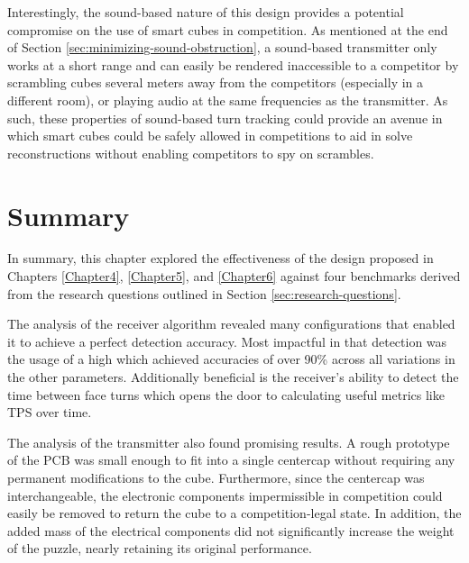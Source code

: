 Interestingly, the sound-based nature of this design provides a
potential compromise on the use of smart cubes in competition. As
mentioned at the end of Section \ref{sec:minimizing-sound-obstruction},
a sound-based transmitter only works at a short range and can easily be
rendered inaccessible to a competitor by scrambling cubes several
meters away from the competitors (especially in a different room), or
playing audio at the same frequencies as the transmitter. As such,
these properties of sound-based turn tracking could provide an avenue
in which smart cubes could be safely allowed in competitions to aid in
solve reconstructions without enabling competitors to spy on scrambles.

\section{Summary}

In summary, this chapter explored the effectiveness of the design
proposed in Chapters \ref{Chapter4}, \ref{Chapter5}, and \ref{Chapter6}
against four benchmarks derived from the research questions outlined in
Section \ref{sec:research-questions}.

The analysis of the receiver algorithm revealed many configurations
that enabled it to achieve a perfect detection accuracy. Most impactful
in that detection was the usage of a high  which
achieved accuracies of over 90\% across all variations in the other
parameters. Additionally beneficial is the receiver's ability to detect
the time between face turns which opens the door to calculating useful
metrics like TPS over time.

The analysis of the transmitter also found promising results. A rough
prototype of the PCB was small enough to fit into a single centercap
without requiring any permanent modifications to the cube. Furthermore,
since the centercap was interchangeable, the electronic components
impermissible in competition could easily be removed to return the cube
to a competition-legal state. In addition, the added mass of the
electrical components did not significantly increase the weight of the
puzzle, nearly retaining its original performance.

